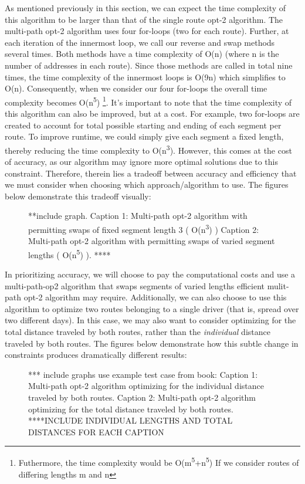 \documentclass[letterpaper]{article}
\begin{document}
    
    As mentioned previously in this section, 
    we can expect the time complexity of this algorithm 
    to be larger than that of the single route opt-2 algorithm. 
    The multi-path opt-2 algorithm uses four for-loops 
    (two for each route). Further, at each iteration 
    of the innermost loop, we call our reverse and swap 
    methods several times. Both methods have a time
     complexity of O(n) (where n is the number of 
     addresses in each route). Since those methods 
     are called in total nine times, the time complexity 
     of the innermost loops is O(9n) which simplifies to O(n).
     Consequently, when we consider our four for-loops 
     the overall time complexity becomes O(n\textsuperscript5)
     \footnote{Futhermore, the time complexity would be 
     O(m\textsuperscript5+n\textsuperscript5) If we consider 
     routes of differing lengths m and n}. It’s important to 
     note that the time complexity of this algorithm 
     can also be improved, but at a cost. For example, 
     two for-loops are created to account for total 
     possible starting and ending of each segment per 
     route. To improve runtime, we could simply give 
     each segment a fixed length, thereby reducing 
     the time complexity to O(n\textsuperscript3). However, 
     this comes at the cost of accuracy, as our algorithm 
     may ignore more optimal solutions due to this constraint. 
     Therefore, therein lies a tradeoff between accuracy and 
     efficiency that we must consider when choosing which 
     approach/algorithm to use. The figures below demonstrate 
     this tradeoff visually:
     \begin{figure}[h]
        \caption{**include graph. Caption 1: Multi-path opt-2 algorithm with permitting swaps of fixed segment length 3 ( O(n\textsuperscript3) )
        Caption 2: Multi-path opt-2 algorithm with permitting swaps of varied segment lengths ( O(n\textsuperscript5) ). ****
        }
    \end{figure}

    In prioritizing accuracy, we will choose to pay the computational costs and use a multi-path-op2 algorithm that swaps segments of varied lengths efficient mulit-path opt-2 algorithm may require. Additionally, we can also choose to use this algorithm to optimize two routes belonging to a single driver (that is, spread over two different days). In this case, we may also want to consider optimizing for the total distance traveled by both routes, rather than the \emph{individual} distance traveled by both routes. The figures below demonstrate how this subtle change in constraints produces dramatically different results:
    \begin{figure}[h]
        \caption{*** include graphs use example test case from book: 
        Caption 1: Multi-path opt-2 algorithm optimizing for the individual distance traveled by both routes. 
        Caption 2: Multi-path opt-2 algorithm optimizing for the total distance traveled by both routes. 
        ****INCLUDE INDIVIDUAL LENGTHS  AND TOTAL DISTANCES FOR EACH CAPTION
        }
    \end{figure}
    
\end{document}
